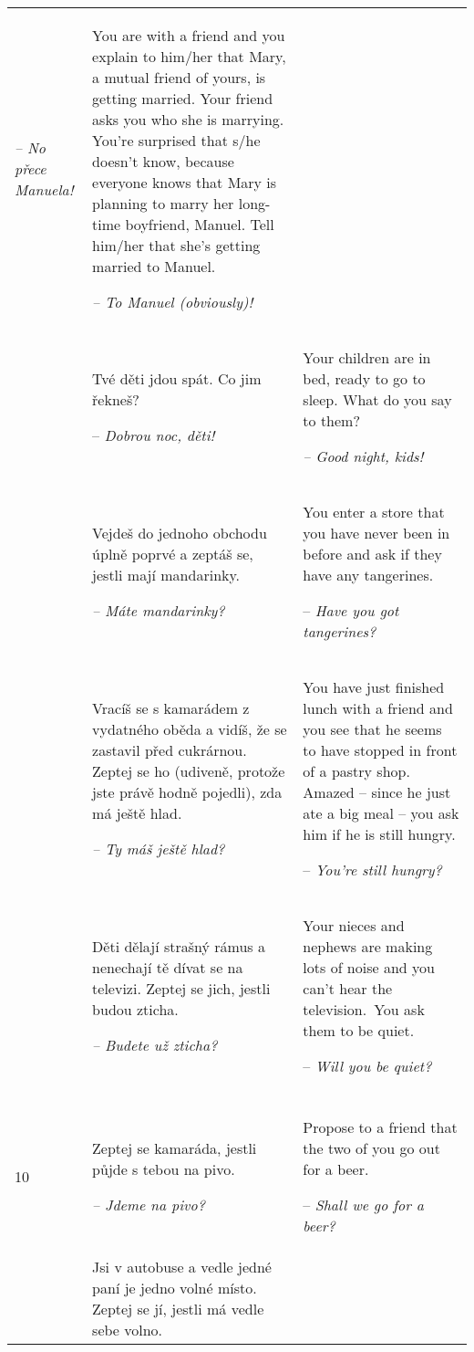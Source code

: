 \begin{xltabular}{\textwidth}{lQQ}
{\itshape -- No přece Manuela!} & You are with a friend and you explain to him/her that Mary, a mutual friend of yours, is getting married. Your friend asks you who she is marrying. You're surprised that s/he doesn’t know, because everyone knows that Mary is planning to marry her long-time boyfriend, Manuel. Tell him/her that she’s getting married to Manuel.

{\itshape -- To Manuel (obviously)!}\\
 & Tvé děti jdou spát. Co jim řekneš?

-- \textit{Dobrou noc, děti!} & Your children are in bed, ready to go to sleep. What do you say to them?

{\itshape -- Good night, kids!}\\
 & Vejdeš do jednoho obchodu úplně poprvé a zeptáš se, jestli mají mandarinky.

{\itshape -- Máte mandarinky?} & You enter a store that you have never been in before and ask if they have any tangerines.

-- \textit{Have you got tangerines?}\\
 & Vracíš se s kamarádem z vydatného oběda a vidíš, že se zastavil před cukrárnou. Zeptej se ho (udiveně, protože jste právě hodně pojedli), zda má ještě hlad.

{\itshape -- Ty máš ještě hlad?} & You have just finished lunch with a friend and you see that he seems to have stopped in front of a pastry shop. Amazed -- since he just ate a big meal -- you ask him if he is still hungry.

-- \textit{You’re still hungry?}\\
 & Děti dělají strašný rámus a nenechají tě dívat se na televizi. Zeptej se jich, jestli budou zticha.

\textit{-- Budete už zticha?} & Your nieces and nephews are making lots of noise and you can’t hear the television.~You ask them to be quiet.

-- \textit{Will you be quiet?}\\
\\
10 & Zeptej se kamaráda, jestli půjde s tebou na pivo.

\textit{-- Jdeme na pivo?} & Propose to a friend that the two of you go out for a beer.

-- \textit{Shall we go for a beer?}\\
 & Jsi v autobuse a vedle jedné paní je jedno volné místo. Zeptej se jí, jestli má vedle sebe volno.


\end{xltabular}
